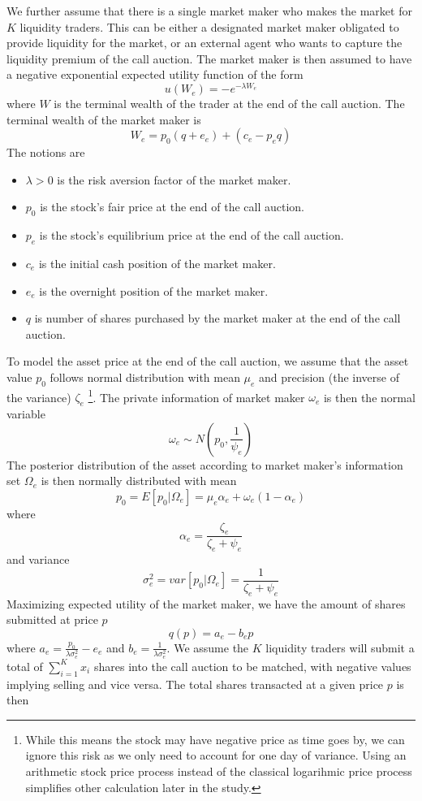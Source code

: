 We further assume that there is a single market maker who makes the market for $K$ liquidity traders. This can be either a designated market maker obligated to provide liquidity for the market, or an external agent who wants to capture the liquidity premium of the call auction. The market maker is then assumed to have a negative exponential expected utility function of the form
\[
  u(W_e) = -e^{-\lambda W_e}
\]
where $W$ is the terminal wealth of the trader at the end of the call auction. The terminal wealth of the market maker is
\[
  W_e = p_0 (q + e_e) + (c_e - p_e q)
\]
The notions are
\begin{itemize}
  \item $\lambda>0$ is the risk aversion factor of the market maker.
  \item $p_0$ is the stock's fair price at the end of the call auction.
  \item $p_e$ is the stock's equilibrium price at the end of the call auction.
  \item $c_e$ is the initial cash position of the market maker.
  \item $e_e$ is the overnight position of the market maker.
  \item $q$ is number of shares purchased by the market maker at the end of the call auction.
\end{itemize}
To model the asset price at the end of the call auction, we assume that the asset value $p_0$ follows normal distribution with mean $\mu_e$ and precision (the inverse of the variance) $\zeta_e$ \footnote{While this means the stock may have negative price as time goes by, we can ignore this risk as we only need to account for one day of variance. Using an arithmetic stock price process instead of the classical logarihmic price process simplifies other calculation later in the study.}. The private information of market maker $\omega_e$ is then the normal variable
\[
  \omega_e \sim N(p_0, \frac{1}{\psi_e})
\]
The posterior distribution of the asset according to market maker's information set $\Omega_e$ is then normally distributed with mean
\[
  p_0=E[p_0|\Omega_e]=\mu_e \alpha_e + \omega_e(1 - \alpha_e)
\]
where
\[
  \alpha_e = \frac{\zeta_e}{\zeta_e+\psi_e}
\]
and variance
\[
  \sigma_e^2=var[p_0|\Omega_e]=\frac{1}{\zeta_e+\psi_e}
\]
Maximizing expected utility of the market maker, we have the amount of shares submitted at price $p$
\begin{equation}\label{eqn:mm_eval_eqb}
  q(p) = a_e - b_e p
\end{equation}
where $a_e = \frac{p_0}{\lambda \sigma_e^2} - e_e$ and $b_e=\frac{1}{\lambda \sigma_e^2}$. We assume the $K$ liquidity traders will submit a total of $\sum_{i=1}^K x_i$ shares into the call auction to be matched, with negative values implying selling and vice versa. The total shares transacted at a given price $p$ is then
